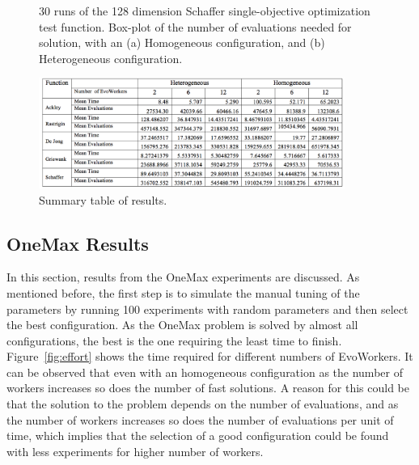 \documentclass{llncs}
\begin{document}
\begin{figure}[t]
    \centering
 

    \caption{30 runs of the 128 dimension Schaffer single-objective optimization test function. 
    Box-plot of the number of evaluations needed for solution, with an (a) Homogeneous configuration, and (b) Heterogeneous configuration.}
    \label{fig:schaffer}
\end{figure}

\begin{figure}[t]
    \centering
        \includegraphics[width=10cm]{img/table.png}
    \caption{Summary table of results. }
    \label{fig:summary}
\end{figure}

\subsection{OneMax Results}
In this section, results from the OneMax experiments are discussed. As mentioned before, the first
step is to simulate the manual tuning of the parameters by running 100 experiments with random 
parameters and then select the best configuration. As the OneMax problem is solved by almost 
all configurations, the best is the one requiring the least time to finish. Figure~\ref{fig:effort} 
shows the time required for different numbers of EvoWorkers. It can be observed that even with an 
homogeneous configuration as the number of workers increases so does
the number of fast solutions.
A reason for this could be that the solution to the problem depends on the number of evaluations, and 
as the number of workers increases so does the number of evaluations
per unit of time, which implies
that the selection of a good configuration could be found with less experiments for higher number 
of workers.
\end{document}
